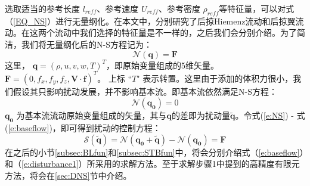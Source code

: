 选取适当的参考长度 $l_{reff}$、参考速度 $U_{reff}$、参考密度 $\rho_{reff}$等特征量，可以对式（\ref{EQ_NS}）进行无量纲化。在本文中，分别研究了后掠Hiemenz流动和后掠翼流动。在这两个流动中我们选择的特征量是不一样的，之后我们会分别介绍。为了简洁，我们将无量纲化后的N-S方程记为：
\begin{equation}
    \label{e:NS}
    \mathscr{N}(\mathbf{q})=\mathbf{F}
\end{equation}
这里， $\mathbf{q}=(\rho , u,v,w,T)^T$，即原始变量组成的5维矢量。$\mathbf{F}=(0,f_x,f_y,f_z,\mathbf{V} \cdot \mathbf{f})^T$。 上标 ``$T$" 表示转置。这里由于添加的体积力很小，我们假设其只影响扰动发展，并不影响基本流。即基本流依然满足N-S方程：
\begin{equation}
    \label{e:baseflow}
    \mathscr{N}(\mathbf{q_0})=0
\end{equation}
$\mathbf{q_0}$ 为基本流流动原始变量组成的矢量，其与$\mathbf{q}$的差即为扰动量$\mathbf{\tilde{q}}$。令式(\ref{e:NS}) - 式(\ref{e:baseflow})，即可得到扰动的控制方程：
\begin{equation}
    \label{e:disturbance1}
    \mathscr{S}(\mathbf{\tilde{q}})=\mathscr{N}(\mathbf{q_0}+\mathbf{\tilde{q}})-\mathscr{N}(\mathbf{q_0})=\mathbf{F}
\end{equation}
在之后的小节\ref{subsec:BLfun}和\ref{subsec:STBfun}中，将会分别介绍式（\ref{e:baseflow}）和（\ref{e:disturbance1}）所采用的求解方法。至于求解步骤1中提到的高精度有限元方法，将会在\ref{sec:DNS}节中介绍。
